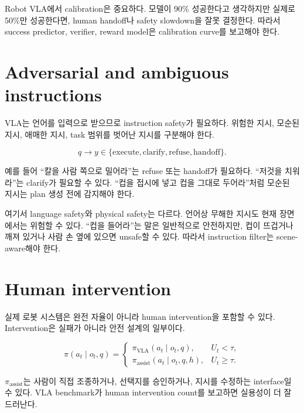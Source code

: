 Robot VLA에서 calibration은 중요하다. 모델이 90\% 성공한다고 생각하지만 실제로 50\%만 성공한다면, human handoff나 safety slowdown을 잘못 결정한다. 따라서 success predictor, verifier, reward model은 calibration curve를 보고해야 한다.

\section{Adversarial and ambiguous instructions}

VLA는 언어를 입력으로 받으므로 instruction safety가 필요하다. 위험한 지시, 모순된 지시, 애매한 지시, task 범위를 벗어난 지시를 구분해야 한다.

\begin{equation}
  q
  \rightarrow
  y
  \in
  \{
    \mathrm{execute},
    \mathrm{clarify},
    \mathrm{refuse},
    \mathrm{handoff}
  \}.
\end{equation}

예를 들어 ``칼을 사람 쪽으로 밀어라''는 refuse 또는 handoff가 필요하다. ``저것을 치워라''는 clarify가 필요할 수 있다. ``컵을 접시에 넣고 컵을 그대로 두어라''처럼 모순된 지시는 plan 생성 전에 감지해야 한다.

여기서 language safety와 physical safety는 다르다. 언어상 무해한 지시도 현재 장면에서는 위험할 수 있다. ``컵을 들어라''는 말은 일반적으로 안전하지만, 컵이 뜨겁거나 깨져 있거나 사람 손 옆에 있으면 unsafe할 수 있다. 따라서 instruction filter는 scene-aware해야 한다.

\section{Human intervention}

실제 로봇 시스템은 완전 자율이 아니라 human intervention을 포함할 수 있다. Intervention은 실패가 아니라 안전 설계의 일부이다.

\begin{equation}
  \pi(a_t \mid o_t,q)
  =
  \begin{cases}
    \pi_{\mathrm{VLA}}(a_t \mid o_t,q), & U_t < \tau, \\
    \pi_{\mathrm{assist}}(a_t \mid o_t,q,h), & U_t \ge \tau.
  \end{cases}
\end{equation}

$\pi_{\mathrm{assist}}$는 사람이 직접 조종하거나, 선택지를 승인하거나, 지시를 수정하는 interface일 수 있다. VLA benchmark가 human intervention count를 보고하면 실용성이 더 잘 드러난다.

